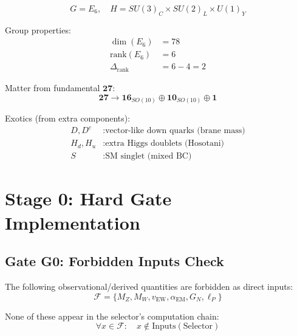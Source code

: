 \documentclass[11pt,a4paper]{article}
\begin{document}
\begin{equation}
\label{eq:e6-group}
G = E_6, \quad H = SU(3)_C \times SU(2)_L \times U(1)_Y
\end{equation}

Group properties:
\begin{align}
\label{eq:e6-dim}
\dim(E_6) &= 78 \\
\label{eq:e6-rank}
\text{rank}(E_6) &= 6 \\
\label{eq:e6-rank-drop}
\Delta_{\text{rank}} &= 6 - 4 = 2
\end{align}

Matter from fundamental $\mathbf{27}$:
\begin{equation}
\label{eq:e6-27-decomp}
\mathbf{27} \to \mathbf{16}_{SO(10)} \oplus \mathbf{10}_{SO(10)} \oplus \mathbf{1}
\end{equation}

Exotics (from extra components):
\begin{align}
\label{eq:e6-exotics-d}
D, D^c &: \text{vector-like down quarks (brane mass)} \\
\label{eq:e6-exotics-h}
H_d, H_u &: \text{extra Higgs doublets (Hosotani)} \\
\label{eq:e6-exotics-s}
S &: \text{SM singlet (mixed BC)}
\end{align}

\section{Stage 0: Hard Gate Implementation}
\label{sec:stage0-impl}

\subsection{Gate G0: Forbidden Inputs Check}
\label{subsec:g0-check}

The following observational/derived quantities are forbidden as direct inputs:
\begin{equation}
\label{eq:forbidden-list}
\mathcal{F} = \{M_Z, M_W, v_{\text{EW}}, \alpha_{\text{EM}}, G_N, \ell_P\}
\end{equation}

None of these appear in the selector's computation chain:
\begin{equation}
\label{eq:forbidden-check}
\forall x \in \mathcal{F}: \quad x \notin \text{Inputs}(\text{Selector})
\end{equation}
\end{document}
